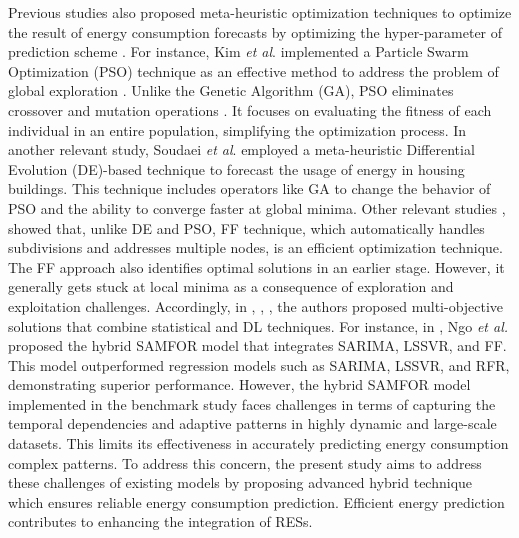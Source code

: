 \documentclass[journal]{IEEEtran}
\begin{document}
  
Previous studies also proposed meta-heuristic optimization techniques to optimize the result of energy consumption forecasts by optimizing the hyper-parameter of prediction scheme \cite{Ref30}. For instance,  Kim \textit{et al}. implemented a Particle Swarm Optimization (PSO) technique as an effective method to address the problem of global exploration \cite{Ref27}. Unlike the Genetic Algorithm (GA), PSO eliminates crossover and mutation operations \cite{Ref28}. It focuses on evaluating the fitness of each individual in an entire population, simplifying the optimization process. In another relevant study, Soudaei \textit{et al}. \cite{Ref29} employed a meta-heuristic Differential Evolution (DE)-based technique to forecast the usage of energy in housing buildings. This technique includes operators like GA to change the behavior of PSO and the ability to converge faster at global minima. Other relevant studies \cite{Ref},\cite{Ref25} showed that, unlike DE and PSO, FF technique, which automatically handles subdivisions and addresses multiple nodes, is an efficient optimization technique. The FF approach also identifies optimal solutions in an earlier stage. However, it generally gets stuck at local minima as a consequence of exploration and exploitation challenges. Accordingly, in \cite{Ref18}, \cite{ref16}, \cite{Ref}, the authors proposed multi-objective solutions that combine statistical and DL techniques. For instance, in \cite{Ref}, Ngo \textit{et al.} proposed the hybrid SAMFOR model that integrates SARIMA, LSSVR, and FF. This model outperformed regression models such as SARIMA, LSSVR, and RFR, demonstrating superior performance. However, the hybrid SAMFOR model implemented in the benchmark study faces challenges in terms of capturing the temporal dependencies and adaptive patterns in highly dynamic and large-scale datasets. This limits its effectiveness in accurately predicting energy consumption complex patterns. To address this concern, the present study aims to address these challenges of existing models by proposing advanced hybrid technique which ensures reliable energy consumption prediction. Efficient energy prediction contributes to enhancing the integration of RESs.
\end{document}
